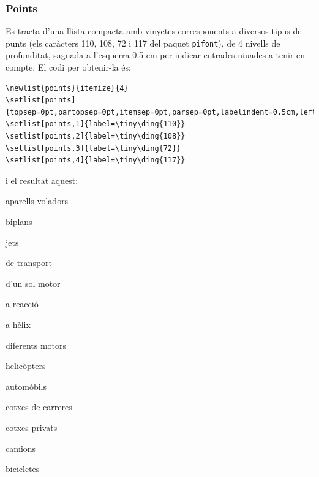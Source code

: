 \documentclass[a4paper,
                             twoside,
                             BCOR1.0cm,
                             DIV11,
                             parskip=full,
                             11pt]{scrbook}
\begin{document}
\subsubsection{Points}\label{ssbsec:points}
Es tracta d'una llista compacta amb vinyetes corresponents a diversos tipus de punts (els caràcters 110, 108, 72 i 117 del paquet \verb+pifont+), de 4 nivells de profunditat,  sagnada a l'esquerra 0.5 cm per indicar  entrades niuades a tenir en compte. El codi per obtenir-la és:
\begin{tiny}
\begin{verbatim}
\newlist{points}{itemize}{4}
\setlist[points]{topsep=0pt,partopsep=0pt,itemsep=0pt,parsep=0pt,labelindent=0.5cm,leftmargin=*}
\setlist[points,1]{label=\tiny\ding{110}}
\setlist[points,2]{label=\tiny\ding{108}}
\setlist[points,3]{label=\tiny\ding{72}}
\setlist[points,4]{label=\tiny\ding{117}}
\end{verbatim}
\end{tiny}
i el resultat aquest:
\begin{points}
\item aparells voladors
	\begin{points}
		\item biplans
		\item jets
		\item de transport
			\begin{points}
				\item d'un sol motor
					\begin{points}
						\item a reacció
						\item a hèlix
					\end{points}
				\item diferents motors
			\end{points}
		\item helicòpters
	\end{points}
\item automòbils
	\begin{points}
		\item cotxes de carreres
		\item cotxes privats
		\item camions
\end{points}
\item bicicletes
\end{points}
\end{document}
